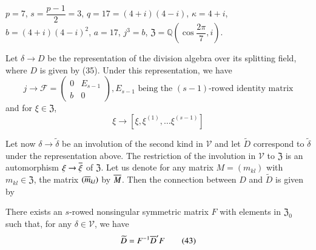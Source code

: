\begin{example*}
$p=7$, $s=\dfrac{p-1}{2}=3$, $q=17=(4+i)(4-i)$, $\kappa = 4+i$,
  $b=(4+i)(4-i)^2$, $a=17$, $j^3=b$, $\mathfrak{Z} =
  \mathbb{Q}\left(\cos \dfrac{2\pi}{7}, i\right)$.

Let $\delta \rightarrow D$ be the representation of the division
algebra over \pageoriginale its splitting field, where $D$ is given
by (35). Under this representation, we have
$$
j \rightarrow \mathscr{F} =
\left(\begin{smallmatrix} 0 & E_{s-1} \\ b &
  0\end{smallmatrix}\right), E_{s-1} \text{ being the $(s-1)$-rowed
    identity matrix}
$$
and for $\xi \in \mathfrak{Z}$,
$$
\xi \rightarrow [\xi, \xi^{(1)}, \ldots \xi^{(s-1)}]
$$

Let now $\delta \rightarrow \widetilde{\delta}$ be an involution of
the second kind in $\mathscr{V}$ and let $\widetilde{D}$ correspond to
$\widetilde{\delta}$ under the representation above. The restriction
of the involution in $\mathscr{V}$ to $\mathfrak{Z}$ is an
automorphism $\xi \rightarrow \overline{\xi}$ of $\mathfrak{Z}$. Let us
denote for any matrix $M = (m_{kl})$ with $m_{kl} \in \mathfrak{Z}$,
the matrix $(\overline{m}_{kl})$ by $\overline{M}$. Then the connection between
$D$ and $\widetilde{D}$ is given by 
\end{example*}

\begin{proposition}
There exists an $s$-rowed nonsingular symmetric matrix $F$ with
elements in $\mathfrak{Z}_0$ such that, for any $\delta\in
\mathscr{V}$, we have
\begin{equation*}
\widetilde{D} = F^{-1} \overline{D}' F \tag{43}\label{eq43}
\end{equation*}
\end{proposition}


